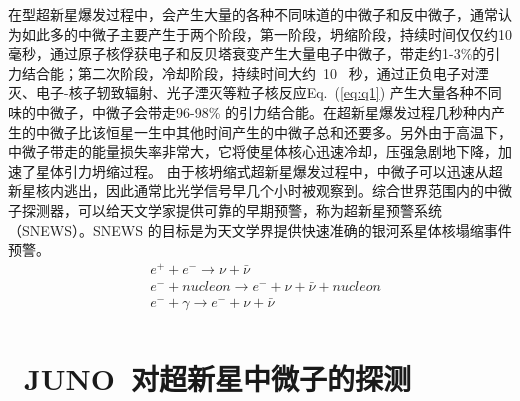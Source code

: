 在\uppercase\expandafter{}型超新星爆发过程中，会产生大量的各种不同味道的中微子和反中微子，通常认为如此多的中微子主要产生于两个阶段，第一阶段，坍缩阶段，持续时间仅仅约10毫秒，通过原子核俘获电子和反贝塔衰变产生大量电子中微子，带走约1-3\%的引力结合能；第二次阶段，冷却阶段，持续时间大约~10~ 秒，通过正负电子对湮灭、电子-核子轫致辐射、光子湮灭等粒子核反应Eq.~(\ref{eq:q1}) 产生大量各种不同味的中微子，中微子会带走96-98\% 的引力结合能。在超新星爆发过程几秒种内产生的中微子比该恒星一生中其他时间产生的中微子总和还要多。另外由于高温下，中微子带走的能量损失率非常大，它将使星体核心迅速冷却，压强急剧地下降，加速了星体引力坍缩过程。
由于核坍缩式超新星爆发过程中，中微子可以迅速从超新星核内逃出，因此通常比光学信号早几个小时被观察到。综合世界范围内的中微子探测器，可以给天文学家提供可靠的早期预警，称为超新星预警系统（SNEWS）。SNEWS 的目标是为天文学界提供快速准确的银河系星体核塌缩事件预警。
\begin{equation}\label{eq:q1}
\begin{split}
 & e^{+}+e^{-} \rightarrow \nu+\bar{\nu} \\
 & e^{-}+nucleon \rightarrow e^{-}+\nu+\bar{\nu} +nucleon\\
 & e^{-}+\gamma \rightarrow  e^{-}+\nu+\bar{\nu} \\
\end{split}
\end{equation}
\section{~JUNO~对超新星中微子的探测}

